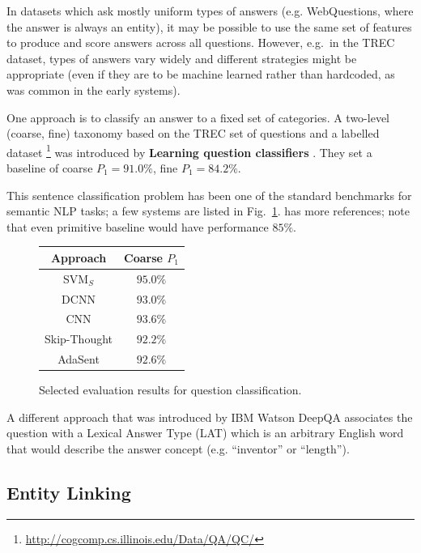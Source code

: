 In datasets which ask mostly uniform types of answers (e.g. WebQuestions,
where the answer is always an entity), it may be possible to use the same
set of features to produce and score answers across all questions.
However, e.g.\ in the TREC dataset, types of answers vary widely and
different strategies might be appropriate (even if they are to be machine
learned rather than hardcoded, as was common in the early systems).

One approach is to classify an answer to a fixed set of categories.
A two-level (coarse, fine) taxonomy based on the TREC set of questions and a labelled dataset%
\footnote{\url{http://cogcomp.cs.illinois.edu/Data/QA/QC/}}
was introduced by \textbf{Learning question classifiers} \citep{QCLearning}.
They set a baseline of coarse $P_1=91.0\%$, fine $P_1=84.2\%$.

This sentence classification problem has been one of the standard benchmarks
for semantic NLP tasks; a few systems are listed in Fig.~\ref{fig:qcbench}.
\citep{AdaSent} has more references; note that even primitive baseline would have performance $85\%$.


\begin{figure}[t]
\centering
\begin{tabular}{|c|c|}
\hline
Approach & Coarse $P_1$ \\
\hline
SVM$_S$ \citep{QCSilvaSVM} & $95.0\%$ \\
DCNN \citep{QtcDCNN} & $93.0\%$ \\
CNN \citep{CNNSentClass} & $93.6\%$ \\
Skip-Thought \citep{SkipThought} & $92.2\%$ \\ %
AdaSent \citep{AdaSent} & $92.6\%$ \\
\hline
\end{tabular}
\vspace*{-0.2cm}
\caption{Selected evaluation results for question classification.}
\label{fig:qcbench}
\end{figure}

A different approach that was introduced by IBM Watson DeepQA \citep{WatsonTyCor}
associates the question with a Lexical Answer Type (LAT) which is
an arbitrary English word that would describe the answer concept
(e.g. ``inventor'' or ``length'').

\subsection{Entity Linking}
\label{sec:entitylink}


